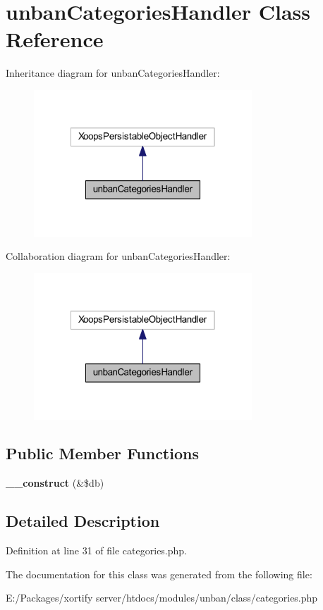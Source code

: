 \hypertarget{classunban_categories_handler}{\section{unban\-Categories\-Handler Class Reference}
\label{classunban_categories_handler}
}


Inheritance diagram for unban\-Categories\-Handler\-:
\nopagebreak
\begin{figure}[H]
\begin{center}
\leavevmode
\includegraphics[width=232pt]{classunban_categories_handler__inherit__graph}
\end{center}
\end{figure}


Collaboration diagram for unban\-Categories\-Handler\-:
\nopagebreak
\begin{figure}[H]
\begin{center}
\leavevmode
\includegraphics[width=232pt]{classunban_categories_handler__coll__graph}
\end{center}
\end{figure}
\subsection*{Public Member Functions}
\begin{DoxyCompactItemize}
\item 
\hypertarget{classunban_categories_handler_aaf2ef772755ec6f361d44e16cc9ffd69}{{\bfseries \-\_\-\-\_\-construct} (\&\$db)}\label{classunban_categories_handler_aaf2ef772755ec6f361d44e16cc9ffd69}

\end{DoxyCompactItemize}


\subsection{Detailed Description}


Definition at line 31 of file categories.\-php.



The documentation for this class was generated from the following file\-:\begin{DoxyCompactItemize}
\item 
E\-:/\-Packages/xortify server/htdocs/modules/unban/class/categories.\-php\end{DoxyCompactItemize}
